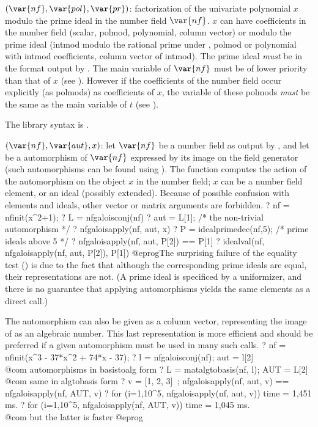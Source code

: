 $(\var{nf},\var{pol},\var{pr})$: \label{se:nffactormod}factorization of the
univariate polynomial $x$ modulo the prime ideal  in the number
field $\var{nf}$. $x$ can have coefficients in the number field (scalar,
polmod, polynomial, column vector) or modulo the prime ideal (intmod
modulo the rational prime under , polmod or polynomial with
intmod coefficients, column vector of intmod). The prime ideal
 \emph{must} be in the format output by . The
main variable of $\var{nf}$ must be of lower priority than that of $x$
(see ). However if the coefficients of the number
field occur explicitly (as polmods) as coefficients of $x$, the variable of
these polmods \emph{must} be the same as the main variable of $t$ (see
).

The library syntax is .

$(\var{nf},\var{aut},x)$: \label{se:nfgaloisapply}let $\var{nf}$ be a
number field as output by , and let  be a 
automorphism of $\var{nf}$ expressed by its image on the field generator
(such automorphisms can be found using ). The function
computes the action of the automorphism  on the object $x$ in the
number field; $x$ can be a number field element, or an ideal (possibly
extended). Because of possible confusion with elements and ideals, other
vector or matrix arguments are forbidden.
 \bprog
 ? nf = nfinit(x^2+1);
 ? L = nfgaloisconj(nf)
 ? aut = L[1]; /* the non-trivial automorphism */
 ? nfgaloisapply(nf, aut, x)
 ? P = idealprimedec(nf,5); /* prime ideals above 5 */
 ? nfgaloisapply(nf, aut, P[2]) == P[1]
 ? idealval(nf, nfgaloisapply(nf, aut, P[2]), P[1])
@eprog\noindent The surprising failure of the equality test () is
due to the fact that although the corresponding prime ideals are equal, their
representations are not. (A prime ideal is specificed by a uniformizer, and
there is no guarantee that applying automorphisms yields the same elements
as a direct  call.)

The automorphism can also be given as a column vector, representing the
image of  as an algebraic number. This last
representation is more efficient and should be preferred if a given
automorphism must be used in many such calls.
\bprog
 ? nf = nfinit(x^3 - 37*x^2 + 74*x - 37);
 ? l = nfgaloisconj(nf); aut = l[2] \\ @com automorphisms in basistoalg form
 ? L = matalgtobasis(nf, l); AUT = L[2] \\ @com same in algtobasis form
 ? v = [1, 2, 3]~; nfgaloisapply(nf, aut, v) == nfgaloisapply(nf, AUT, v)
 ? for (i=1,10^5, nfgaloisapply(nf, aut, v))
 time = 1,451 ms.
 ? for (i=1,10^5, nfgaloisapply(nf, AUT, v))
 time = 1,045 ms.  \\ @com but the latter is faster
@eprog

